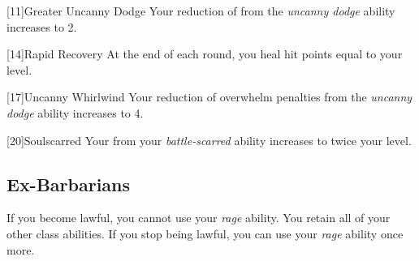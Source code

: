         [11]{Greater Uncanny Dodge}
        Your reduction of  from the \textit{uncanny dodge} ability increases to 2.

        [14]{Rapid Recovery}
        At the end of each round, you heal hit points equal to your level.

        [17]{Uncanny Whirlwind}
        Your reduction of overwhelm penalties from the \textit{uncanny dodge} ability increases to 4.

        [20]{Soulscarred}
        Your  from your \textit{battle-scarred} ability increases to twice your level.

    \subsection{Ex-Barbarians}
        If you become lawful, you cannot use your \textit{rage} ability.
        You retain all of your other class abilities.
        If you stop being lawful, you can use your \textit{rage} ability once more.


